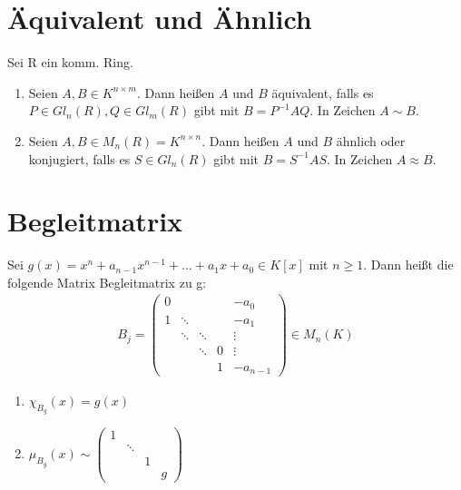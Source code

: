 \section{Äquivalent und Ähnlich}
\begin{definition}
Sei R ein komm. Ring.
\begin{enumerate}
	\item Seien $A,B \in K^{n \times m}$. Dann heißen $A$ und $B$ äquivalent, falls es $P \in Gl_n(R), Q \in Gl_m(R)$ gibt mit $B=P^{-1}AQ$. In Zeichen $A \sim B$.
	\item Seien $A,B \in M_n(R) = K^{n \times n}$. Dann heißen $A$ und $B$ ähnlich oder konjugiert, falls es $S \in Gl_n(R)$ gibt mit $B=S^{-1}AS$. In Zeichen $A \approx B$.
\end{enumerate}
\end{definition}

\section{Begleitmatrix}
\begin{definition}
Sei $g(x) = x^n + a_{n-1}x^{n-1}+\ldots+a_1x + a_0 \in K[x]$ mit $n \geq 1$. Dann heißt die folgende Matrix Begleitmatrix zu g:
\begin{align*}
B_j =
\begin{pmatrix}
0 &        &		&  & -a_0 \\
1 & \ddots &		&  & -a_1 \\
  & \ddots & \ddots	&  & \vdots \\
  &        & \ddots	& 0 & \vdots \\
  &        &		& 1 & -a_{n-1}
\end{pmatrix}
\in M_n(K)
\end{align*} 
\end{definition}
\begin{remark}
\begin{enumerate}
	\item $\chi_{B_g}(x) = g(x)$
	\item $\mu_{B_g}(x) \sim 
	\begin{pmatrix}
		1 &        & & \\
		  & \ddots & & \\
		  &        &1& \\
		  &        & & g
	\end{pmatrix}$
\end{enumerate}
\end{remark}
